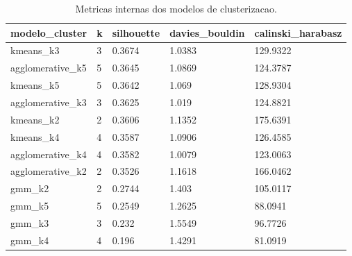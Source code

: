 \begin{table}[htbp]
\centering
\caption{Metricas internas dos modelos de clusterizacao.}
\label{tab:metricas-clusterizacao}
\begin{tabular}{lllll}
\hline
modelo\_cluster & k & silhouette & davies\_bouldin & calinski\_harabasz \\
\hline
kmeans\_k3 & 3 & 0.3674 & 1.0383 & 129.9322 \\
agglomerative\_k5 & 5 & 0.3645 & 1.0869 & 124.3787 \\
kmeans\_k5 & 5 & 0.3642 & 1.069 & 128.9304 \\
agglomerative\_k3 & 3 & 0.3625 & 1.019 & 124.8821 \\
kmeans\_k2 & 2 & 0.3606 & 1.1352 & 175.6391 \\
kmeans\_k4 & 4 & 0.3587 & 1.0906 & 126.4585 \\
agglomerative\_k4 & 4 & 0.3582 & 1.0079 & 123.0063 \\
agglomerative\_k2 & 2 & 0.3526 & 1.1618 & 166.0462 \\
gmm\_k2 & 2 & 0.2744 & 1.403 & 105.0117 \\
gmm\_k5 & 5 & 0.2549 & 1.2625 & 88.0941 \\
gmm\_k3 & 3 & 0.232 & 1.5549 & 96.7726 \\
gmm\_k4 & 4 & 0.196 & 1.4291 & 81.0919 \\
\hline
\end{tabular}
\end{table}
